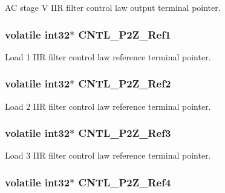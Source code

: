 A\-C stage V I\-I\-R filter control law output terminal pointer. \hypertarget{a00014_a98527ce76f5175fa2933d46f324d85fb}{
\subsubsection[{C\-N\-T\-L\-\_\-2\-P2\-Z\-\_\-\-Ref1}]{\setlength{\rightskip}{0pt plus 5cm}volatile int32$\ast$ C\-N\-T\-L\-\_\-P2\-Z\-\_\-\-Ref1}}\label{a00014_a98527ce76f5175fa2933d46f324d85fb}
Load 1 I\-I\-R filter control law reference terminal pointer. \hypertarget{a00014_a9bf1756a901a3a74d9f43a51f85cede4}{
\subsubsection[{C\-N\-T\-L\-\_\-2\-P2\-Z\-\_\-\-Ref2}]{\setlength{\rightskip}{0pt plus 5cm}volatile int32$\ast$ C\-N\-T\-L\-\_\-P2\-Z\-\_\-\-Ref2}}\label{a00014_a9bf1756a901a3a74d9f43a51f85cede4}
Load 2 I\-I\-R filter control law reference terminal pointer. \hypertarget{a00014_a859e9bbd5bc82f1b42863a93e4f992af}{
\subsubsection[{C\-N\-T\-L\-\_\-2\-P2\-Z\-\_\-\-Ref3}]{\setlength{\rightskip}{0pt plus 5cm}volatile int32$\ast$ C\-N\-T\-L\-\_\-P2\-Z\-\_\-\-Ref3}}\label{a00014_a859e9bbd5bc82f1b42863a93e4f992af}
Load 3 I\-I\-R filter control law reference terminal pointer. \hypertarget{a00014_af54c55f228deb8189c44282a94a870c1}{
\subsubsection[{C\-N\-T\-L\-\_\-2\-P2\-Z\-\_\-\-Ref4}]{\setlength{\rightskip}{0pt plus 5cm}volatile int32$\ast$ C\-N\-T\-L\-\_\-P2\-Z\-\_\-\-Ref4}}\label{a00014_af54c55f228deb8189c44282a94a870c1}
